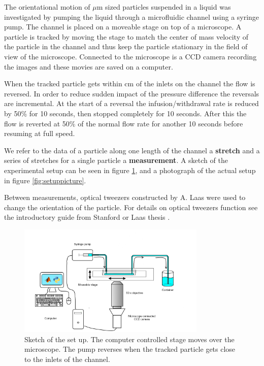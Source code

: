 \label{sec:exp_setup}
The orientational motion of $\mu$m sized particles suspended in a liquid was investigated by pumping the liquid through a microfluidic channel using a syringe pump. The channel is placed on a moveable stage on top of a microscope. A particle is tracked by moving the stage to match the center of mass velocity of the particle in the channel and thus keep the particle stationary in the field of view of the microscope. Connected to the microscope is a CCD camera recording the images and these movies are saved on a computer. 

When the tracked particle gets within \unit[1]{cm} of the inlets on the channel the flow is reversed. In order to reduce sudden impact of the pressure difference the reversals are incremental. At the start of a reversal the infusion/withdrawal rate is reduced by 50\% for 10 seconds, then stopped completely for 10 seconds. After this the flow is reverted at 50\% of the normal flow rate for another 10 seconds before resuming at full speed. 

We refer to the data of a particle along one length of the channel a \textbf{stretch} and a series of stretches for a single particle a \textbf{measurement}. A sketch of the experimental setup can be seen in figure \ref{fig:setupsketch}, and a photograph of the actual setup in figure \ref{fig:setuppicture}. 

Between measurements, optical tweezers constructed by A. Laas were used to change the orientation of the particle. For details on optical tweezers function see the introductory guide from Stanford \cite{OpticalTweezer} or Laas thesis \cite{alexanderThesis}. 


\begin{figure}[H]
\centering
\includegraphics[width=0.8\textwidth]{figures/method/setupsketch.png}
\caption{Sketch of the set up. The computer controlled stage moves over the microscope. The pump reverses when the tracked particle gets close to the inlets of the channel.}\label{fig:setupsketch}
\end{figure}

